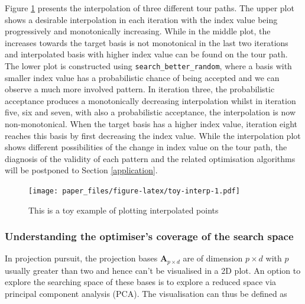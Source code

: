 \documentclass[12pt]{article}
\begin{document}
Figure \ref{toy-interp} presents the interpolation of three different
tour paths. The upper plot shows a desirable interpolation in each
iteration with the index value being progressively and monotonically
increasing. While in the middle plot, the increases towards the target
basis is not monotonical in the last two iterations and interpolated
basis with higher index value can be found on the tour path. The lower
plot is constructed using \texttt{search\_better\_random}, where a basis
with smaller index value has a probabilistic chance of being accepted
and we can observe a much more involved pattern. In iteration three, the
probabilistic acceptance produces a monotonically decreasing
interpolation whilst in iteration five, six and seven, with also a
probabilistic acceptance, the interpolation is now non-monotonical. When
the target basis has a higher index value, iteration eight reaches this
basis by first decreasing the index value. While the interpolation plot
shows different possibilities of the change in index value on the tour
path, the diagnosis of the validity of each pattern and the related
optimisation algorithms will be postponed to Section \ref{application}.

\begin{figure}
\centering
\texttt{[image: paper\_files/figure-latex/toy-interp-1.pdf]}
\caption{\label{toy-interp} This is a toy example of plotting
interpolated points}
\end{figure}

\newpage

\hypertarget{understanding-the-optimisers-coverage-of-the-search-space}{%
\subsubsection{Understanding the optimiser's coverage of the search
space}\label{understanding-the-optimisers-coverage-of-the-search-space}}

In projection pursuit, the projection bases \(\mathbf{A}_{p \times d}\)
are of dimension \(p \times d\) with \(p\) usually greater than two and
hence can't be visualised in a 2D plot. An option to explore the
searching space of these bases is to explore a reduced space via
principal component analysis (PCA). The visualisation can thus be
defined as
\end{document}
